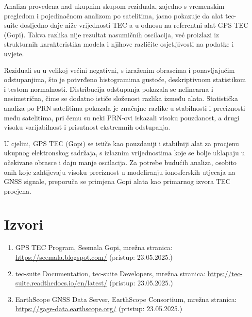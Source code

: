 \documentclass[
]{article}
\providecommand{\tightlist}{%
  \setlength{\itemsep}{0pt}\setlength{\parskip}{0pt}}
\begin{document}
Analiza provedena nad ukupnim skupom reziduala, zajedno s vremenskim
pregledom i pojedinačnom analizom po satelitima, jasno pokazuje da alat
tec-suite dosljedno daje niže vrijednosti TEC-a u odnosu na referentni
alat GPS TEC (Gopi). Takva razlika nije rezultat nasumičnih oscilacija,
već proizlazi iz strukturnih karakteristika modela i njihove različite
osjetljivosti na podatke i uvjete.

Reziduali su u velikoj većini negativni, s izraženim obrascima i
ponavljajućim odstupanjima, što je potvrđeno histogramima gustoće,
deskriptivnom statistikom i testom normalnosti. Distribucija odstupanja
pokazala se nelinearna i nesimetrična, čime se dodatno ističe složenost
razlika između alata. Statistička analiza po PRN satelitima pokazala je
značajne razlike u stabilnosti i preciznosti među satelitima, pri čemu
su neki PRN-ovi iskazali visoku pouzdanost, a drugi visoku varijabilnost
i prisutnost ekstremnih odstupanja.

U cjelini, GPS TEC (Gopi) se ističe kao pouzdaniji i stabilniji alat za
procjenu ukupnog elektronskog sadržaja, s izlaznim vrijednostima koje se
bolje uklapaju u očekivane obrasce i daju manje oscilacija. Za potrebe
budućih analiza, osobito onih koje zahtijevaju visoku preciznost u
modeliranju ionosferskih utjecaja na GNSS signale, preporuča se primjena
Gopi alata kao primarnog izvora TEC procjena.

\section{Izvori}\label{izvori}

\begin{enumerate}
\def\labelenumi{\arabic{enumi}.}
\tightlist
\item
  GPS TEC Program, Seemala Gopi, mrežna stranica:
  \url{https://seemala.blogspot.com/} (pristup: 23.05.2025.)
\item
  tec-suite Documentation, tec-suite Developers, mrežna stranica:
  \url{https://tec-suite.readthedocs.io/en/latest/} (pristup:
  23.05.2025.)
\item
  EarthScope GNSS Data Server, EarthScope Consortium, mrežna stranica:
  \url{https://gage-data.earthscope.org/} (pristup: 23.05.2025.)
\end{enumerate}
\end{document}

